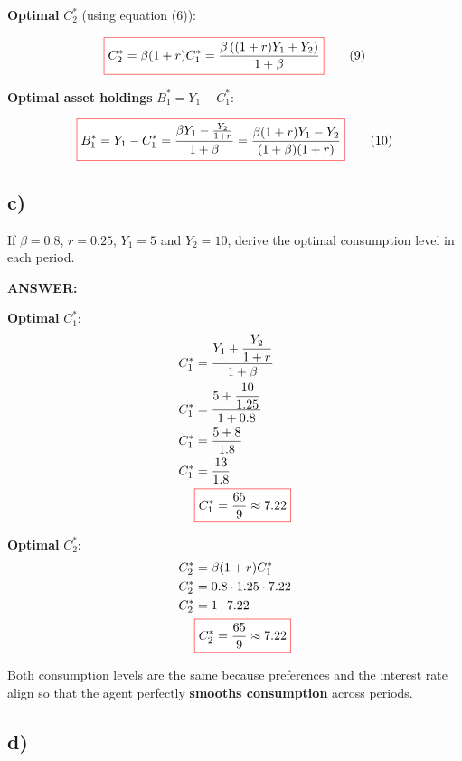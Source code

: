 \documentclass[12pt]{article}
\begin{document}
\textbf{Optimal } \( C_2^* \) (using equation (6)):

\[
\fcolorbox{red}{white}{$
\displaystyle
C_2^* = \beta(1 + r)C_1^* = \frac{\beta\left( (1 + r)Y_1 + Y_2 \right)}{1 + \beta}
$} \tag{9}
\]

\textbf{Optimal asset holdings } \( B_1^* = Y_1 - C_1^* \):

\[
\fcolorbox{red}{white}{$
\displaystyle
B_1^* = Y_1 - C_1^* = \frac{\beta Y_1 - \frac{Y_2}{1 + r}}{1 + \beta}
= \frac{\beta(1 + r)Y_1 - Y_2}{(1 + \beta)(1 + r)}
$} \tag{10}
\]


\subsection*{\noindent\textbf{c)}}


If \( \beta = 0.8 \), \( r = 0.25 \), \( Y_1 = 5 \) and \( Y_2 = 10 \), derive the optimal consumption level in each period.

\vspace{0.5em}
\noindent\textcolor{formalred}{\textbf{ANSWER:}}

\textbf{Optimal } \( C_1^* \):
\begin{align*}
C_1^* &= \frac{Y_1 + \dfrac{Y_2}{1 + r}}{1 + \beta} \\
C_1^* &= \frac{5 + \dfrac{10}{1.25}}{1 + 0.8} \\
C_1^* &= \frac{5 + 8}{1.8} \\
C_1^* &= \frac{13}{1.8} \\
&\fcolorbox{red}{white}{$
\displaystyle C_1^* = \frac{65}{9} \approx 7.22
$}
\end{align*}

\vspace{1em}
\textbf{Optimal } \( C_2^* \):
\begin{align*}
C_2^* &= \beta(1 + r)C_1^* \\
C_2^* &= 0.8 \cdot 1.25 \cdot 7.22 \\
C_2^* &= 1 \cdot 7.22 \\
&\fcolorbox{red}{white}{$
\displaystyle C_2^* = \frac{65}{9} \approx 7.22
$}
\end{align*}

Both consumption levels are the same because preferences and the interest rate align so that the agent perfectly \textbf{smooths consumption} across periods.

\subsection*{\noindent\textbf{d)}}
\end{document}
